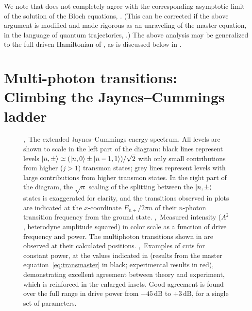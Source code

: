 We note that  does not completely agree with the corresponding asymptotic limit of the solution of the Bloch equations, . (This can be corrected if the above argument is modified and made rigorous as an unraveling of the master equation, in the language of quantum trajectories, .) The above analysis may be generalized to the full driven Hamiltonian of , as is discussed below in .

\section[%
    \texorpdfstring{Multi-photon transitions: Climbing the Jaynes--Cummings ladder}%
    {Multi-photon transitions}]%
    {Multi-photon transitions:\\Climbing the Jaynes--Cummings ladder%
    }
\label{sec:multiphoton}
\begin{figure}
 \centering
 \caption[Emergence of $\sqrt{n}$ peaks under strong driving of the vacuum Rabi transition]
  { ,~The extended Jaynes--Cummings energy spectrum. All levels are shown to scale in the left part of the diagram: black lines represent levels $\left\lvert n,\pm \right\rangle\simeq(\left\lvert n,0 \right\rangle\pm\left\lvert n-1,1 \right\rangle)/\sqrt{2}$ with only small contributions from higher ($j>1$) transmon states; grey lines represent levels with large contributions from higher transmon states. In the right part of the diagram, the $\sqrt{n}$ scaling of the splitting between the $\left\lvert n,\pm \right\rangle$ states is exaggerated for clarity, and the transitions observed in plots  are indicated at the $x$-coordinate $E_{n\pm}/2\pi n$ of their $n$-photon transition frequency from the ground state. ,~Measured intensity ($A^2$, heterodyne amplitude squared) in color scale as a function of drive frequency and power. The multiphoton transitions shown in  are observed at their calculated positions. ,~Examples of cuts for constant power, at the values indicated in  (results from the master equation~\eqref{eq:transmaster} in black; experimental results in red), demonstrating excellent agreement between theory and experiment, which is reinforced in the enlarged insets. Good agreement is found over the full range in drive power from $-45\,\text{dB}$ to $+3\,\text{dB}$, for a single set of parameters.\label{fig:powsweep}}
\end{figure}%
